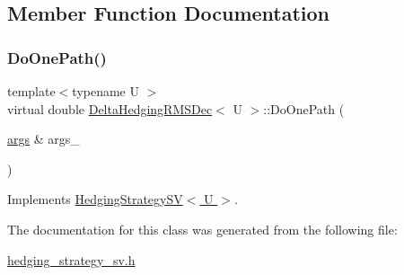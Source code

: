 \subsection{Member Function Documentation}
\hypertarget{classDeltaHedgingRMSDec_aa9118ce56921178e38a7ed8a6acee656}{}\label{classDeltaHedgingRMSDec_aa9118ce56921178e38a7ed8a6acee656} 
\subsubsection{\texorpdfstring{Do\+One\+Path()}{DoOnePath()}}
{\footnotesize\ttfamily template$<$typename U $>$ \\
virtual double \hyperlink{classDeltaHedgingRMSDec}{Delta\+Hedging\+R\+M\+S\+Dec}$<$ U $>$\+::Do\+One\+Path (\begin{DoxyParamCaption}\item[{\hyperlink{path__generation_8h_a75c13cde2074f502cc4348c70528572d}{args} \&}]{args\+\_\+ }\end{DoxyParamCaption})\hspace{0.3cm}{\ttfamily [virtual]}}



Implements \hyperlink{classHedgingStrategySV_abb9531c069f4d1e758fc23c4bc7ed09c}{Hedging\+Strategy\+S\+V$<$ U $>$}.



The documentation for this class was generated from the following file\+:\begin{DoxyCompactItemize}
\item 
\hyperlink{hedging__strategy__sv_8h}{hedging\+\_\+strategy\+\_\+sv.\+h}\end{DoxyCompactItemize}
